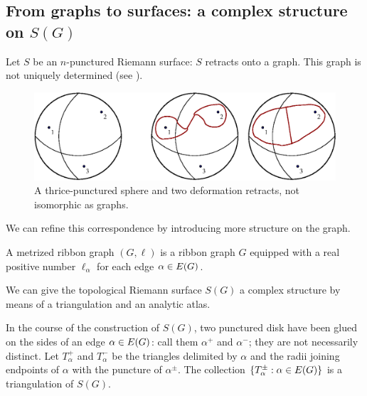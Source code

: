 \subsection{From graphs to surfaces: a complex structure on $S(G)$}
\label{sec:atlas}

Let $S$ be an $n$-punctured Riemann surface: $S$ retracts onto a
graph. This graph is not uniquely determined (see
).
\begin{figure}[bt]
  \centering\includegraphics[width=\textwidth]{sfera3}
  \caption{A thrice-punctured sphere and two deformation retracts, not
    isomorphic as graphs.}
  \label{fig:sphere-retracts}
\end{figure}
We can refine this correspondence by introducing more structure on the
graph.
\begin{definition}
  \label{dfn:metric-ribbon-graphs}
  A metrized ribbon graph $(G, \ell)$ is a ribbon graph $G$ equipped with
  a real positive number $\ell_\alpha$ for each edge $\alpha \in E(G)$.
\end{definition}

We can give the topological Riemann surface $S(G)$ a complex
structure by means of a triangulation and an analytic atlas.

In the course of the construction of $S(G)$, two punctured disk have
been glued on the sides of an edge $\alpha \in E(G)$: call them $\alpha^+$
and $\alpha^-$; they are not necessarily distinct.  Let $T_\alpha^+$ and $T_\alpha^-$
be the triangles delimited by $\alpha$ and the radii joining endpoints of
$\alpha$ with the puncture of $\alpha^\pm$. The collection $\{T_\alpha^\pm : \alpha \in
E(G)\}$ is a triangulation of $S(G)$.


